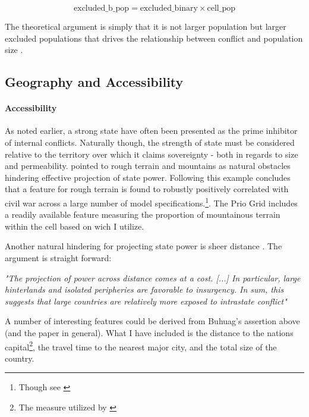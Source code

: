 \documentclass[a4paper]{article}
\begin{document}
$$ \textrm{excluded\_b\_pop}  = \textrm{excluded\_binary} \times \textrm{cell\_pop}  $$

The theoretical argument is simply that it is not larger population but larger excluded populations that drives the relationship between conflict and population size \citep[69-74]{Cederman_Gleditsch_Buhaug_2013}.

\subsection{Geography and Accessibility} %

\paragraph{Accessibility} As noted earlier, a strong state have often been presented as the prime inhibitor of internal conflicts. Naturally though, the strength of state must be considered relative to the territory over which it claims sovereignty - both in regards to size and permeability. \cite{Fearon_Laitin_2003} pointed to rough terrain and mountains as natural obstacles hindering effective projection of state power. Following this example \cite{Hegre_Sambanis_2006} concludes that a feature for rough terrain is found to robustly positively correlated with civil war across a large number of model specifications.\cite[526-529]{Hegre_Sambanis_2006}\footnote{Though see \cite{Goldstone_2010}}. The Prio Grid includes a readily available feature measuring the proportion of mountainous terrain within the cell based on \cite{Blyth_2002} wich I utilize.\par

Another natural hindering for projecting state power is sheer distance \citep{Fearon_2004, Buhaug_Gates_Lujala_2009, Cederman_Buhaug_Roed_2009, Buhaug_2010}. The argument is straight forward:

\begin{displayquote}

\emph{"The projection of power across distance comes at a cost. [...] In particular, large hinterlands and isolated peripheries are favorable to insurgency. In sum, this suggests that large countries are relatively more exposed to intrastate conflict"}\cite[113-114]{Buhaug_2010}

\end{displayquote}

A number of interesting features could be derived from Buhuag's assertion above (and the paper in general). What I have included is the distance to the nations capital\footnote{The measure utilized by \cite{Buhaug_2010}}, the travel time to the nearest major city, and the total size of the country\cite{prio_code_2015}.
\end{document}
